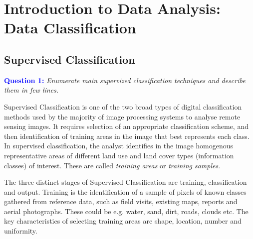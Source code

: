 \section{Introduction to Data Analysis: Data Classification}
\label{sec:data_analysis}

\subsection{Supervised Classification}
\textcolor{blue}{\textbf{Question 1:}}
\textit{Enumerate main supervized classiﬁcation techniques and describe them in few lines.}

Supervised Classification is one of the two broad types of digital classification methods used by the majority of image processing systems to analyse remote sensing images. It requires selection of an appropriate classification scheme, and then identification of training areas in the image that best represents each class. In supervised classification, the analyst identifies in the image homogenous representative areas of different land use and land cover types (information classes) of interest. These are called \textit{training areas} or \textit{training samples}. 

The three distinct stages of Supervised Classification are training, classification and output. Training is the identification of a sample of pixels of known classes gathered from reference data, such as field visits, existing maps, reports and aerial photographs. These could be e.g. water, sand, dirt, roads, clouds etc. The key characteristics of selecting training areas are shape, location, number and uniformity.



